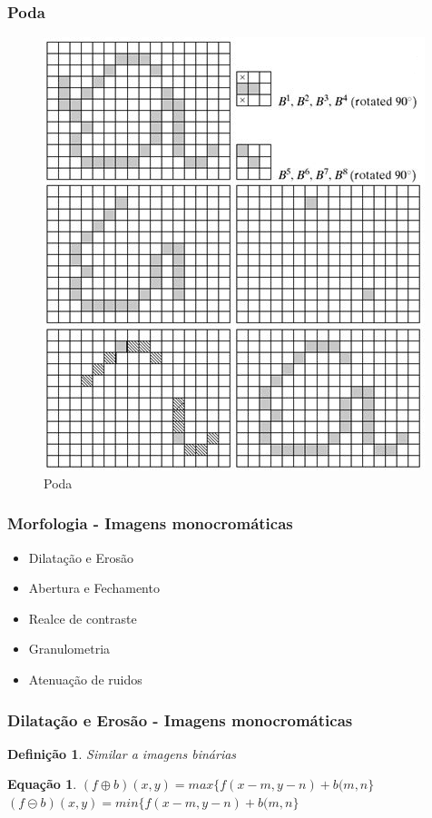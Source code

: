 \documentclass[aspectratio=169]{beamer}
\theoremstyle{Definition}
\newtheorem{defn}{Defini\c c\~ao}
\newtheorem{eq}[theorem]{Equa\c c\~ao}
\begin{document}
\begin{frame}
	\frametitle{Poda}
	
	\begin{figure}[h]
	 	\includegraphics[width=0.6\paperwidth,height=0.6\paperheight]{imagens/prunninga}
		\caption{Poda}\label{figPrune}
	\end{figure}
	
\end{frame}

\begin{frame}
	\frametitle{Morfologia - Imagens monocromáticas}
	
	\begin{itemize}
		\item Dilatação e Erosão
		\item Abertura e Fechamento
		\item Realce de contraste
		\item Granulometria
		\item Atenuação de ruidos 
	\end{itemize}
	
	
\end{frame}

\begin{frame}
	\frametitle{Dilatação e Erosão - Imagens monocromáticas}
	
	\begin{defn}
		Similar a imagens binárias
	\end{defn}
	
	\begin{eq}
			$ (f \oplus b)(x,y) = max \{ f(x-m, y-n) + b(m,n \} $ \\
			$ (f \circleddash b)(x,y) = min \{ f(x-m, y-n) + b(m,n \} $
	\end{eq}
	
	
\end{frame}
\end{document}
